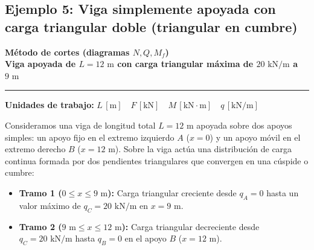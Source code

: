 \subsection{Ejemplo 5: Viga simplemente apoyada con carga triangular doble (triangular en cumbre)}

\begin{tcolorbox}[colback=blue!3!white, colframe=blue!40!black, arc=3pt, boxrule=0.8pt, left=8pt, right=8pt, top=6pt, bottom=6pt]
    \centering
    {\Large\bfseries\color{blue!60!black} Método de cortes (diagramas $N, Q, M_f$)}\\[2pt]
    {\normalsize\bfseries Viga apoyada de $L = 12\text{ m}$ con carga triangular máxima de $20\text{ kN/m}$ a $9\text{ m}$}

    \vspace{4pt}\hrule\vspace{4pt}
    {\small\textbf{Unidades de trabajo:} $L\,[\text{m}] \quad F\,[\text{kN}] \quad M\,[\text{kN}\cdot\text{m}] \quad q\,[\text{kN/m}]$}
\end{tcolorbox}


Consideramos una viga de longitud total $L = 12\text{ m}$ apoyada sobre dos apoyos simples: un apoyo fijo en el extremo izquierdo $A$ ($x = 0$) y un apoyo móvil en el extremo derecho $B$ ($x = 12\text{ m}$). Sobre la viga actúa una distribución de carga continua formada por dos pendientes triangulares que convergen en una cúspide o cumbre:
\begin{itemize}
    \item \textbf{Tramo 1 ($0 \le x \le 9\text{ m}$):} Carga triangular creciente desde $q_A = 0$ hasta un valor máximo de $q_C = 20\text{ kN/m}$ en $x = 9\text{ m}$.
    \item \textbf{Tramo 2 ($9\text{ m} \le x \le 12\text{ m}$):} Carga triangular decreciente desde $q_C = 20\text{ kN/m}$ hasta $q_B = 0$ en el apoyo $B$ ($x = 12\text{ m}$).
\end{itemize}

